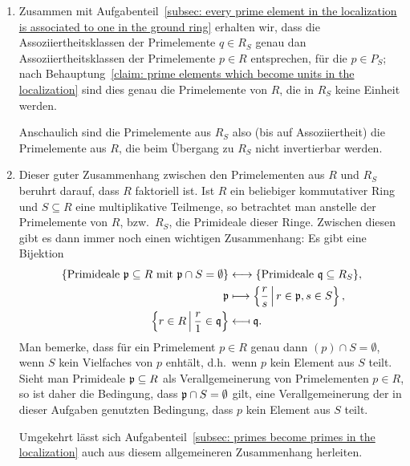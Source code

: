 \documentclass[a4paper,10pt,numbers=noenddot]{scrartcl}
\begin{document}
\begin{remark}
  \begin{enumerate}
    \item
      Zusammen mit Aufgabenteil~\ref{subsec: every prime element in the localization is associated to one in the ground ring} erhalten wir, dass die Assoziiertheitsklassen der Primelemente $q \in R_S$ genau dan Assoziiertheitsklassen der Primelemente $p \in R$ entsprechen, für die $p \in P_S$; nach Behauptung~\ref{claim: prime elements which become units in the localization} sind dies genau die Primelemente von $R$, die in $R_S$ keine Einheit werden.
      
      Anschaulich sind die Primelemente aus $R_S$ also (bis auf Assoziiertheit) die Primelemente aus $R$, die beim Übergang zu $R_S$ nicht invertierbar werden.
    \item
      Dieser guter Zusammenhang zwischen den Primelementen aus $R$ und $R_S$ beruhrt darauf, dass $R$ faktoriell ist.
      Ist $R$ ein beliebiger kommutativer Ring und $S \subseteq R$ eine multiplikative Teilmenge, so betrachtet man anstelle der Primelemente von $R$, bzw.\ $R_S$, die Primideale dieser Ringe.
      Zwischen diesen gibt es dann immer noch einen wichtigen Zusammenhang:
      Es gibt eine Bijektion
      \begin{align*}
                              \{\text{Primideale $\mathfrak{p} \subseteq R$ mit $\mathfrak{p} \cap S = \emptyset$}\}
        &\longleftrightarrow  \{\text{Primideale $\mathfrak{q} \subseteq R_S$}\},
         \\
                              \mathfrak{p}
        &\longmapsto          \left\{ \frac{r}{s} \,\middle|\, r \in \mathfrak{p}, s \in S \right\},
        \\
                              \left\{ r \in R \,\middle|\, \frac{r}{1} \in \mathfrak{q} \right\}
        &\longmapsfrom        \mathfrak{q}.
      \end{align*}
      Man bemerke, dass für ein Primelement $p \in R$ genau dann $(p) \cap S = \emptyset$, wenn $S$ kein Vielfaches von $p$ enhtält, d.h.\ wenn $p$ kein Element aus $S$ teilt.
      Sieht man Primideale $\mathfrak{p} \subseteq R$ als Verallgemeinerung von Primelementen $p \in R$, so ist daher die Bedingung, dass $\mathfrak{p} \cap S = \emptyset$ gilt, eine Verallgemeinerung der in dieser Aufgaben genutzten Bedingung, dass $p$ kein Element aus $S$ teilt.
      
      Umgekehrt lässt sich Aufgabenteil~\ref{subsec: primes become primes in the localization} auch aus diesem allgemeineren Zusammenhang herleiten.
  \end{enumerate}
\end{remark}
\end{document}
